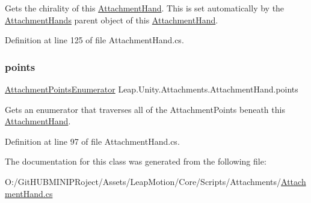 Gets the chirality of this \mbox{\hyperlink{class_leap_1_1_unity_1_1_attachments_1_1_attachment_hand}{Attachment\+Hand}}. This is set automatically by the \mbox{\hyperlink{class_leap_1_1_unity_1_1_attachments_1_1_attachment_hands}{Attachment\+Hands}} parent object of this \mbox{\hyperlink{class_leap_1_1_unity_1_1_attachments_1_1_attachment_hand}{Attachment\+Hand}}. 



Definition at line 125 of file Attachment\+Hand.\+cs.

\mbox{\label{class_leap_1_1_unity_1_1_attachments_1_1_attachment_hand_aeb29b522823d247cf907a2488f1fbebf}} 
\subsubsection{\texorpdfstring{points}{points}}
{\footnotesize\ttfamily \mbox{\hyperlink{struct_leap_1_1_unity_1_1_attachments_1_1_attachment_hand_1_1_attachment_points_enumerator}{Attachment\+Points\+Enumerator}} Leap.\+Unity.\+Attachments.\+Attachment\+Hand.\+points\hspace{0.3cm}{\ttfamily [get]}}



Gets an enumerator that traverses all of the Attachment\+Points beneath this \mbox{\hyperlink{class_leap_1_1_unity_1_1_attachments_1_1_attachment_hand}{Attachment\+Hand}}. 



Definition at line 97 of file Attachment\+Hand.\+cs.



The documentation for this class was generated from the following file\+:\begin{DoxyCompactItemize}
\item 
O\+:/\+Git\+H\+U\+B\+M\+I\+N\+I\+P\+Roject/\+Assets/\+Leap\+Motion/\+Core/\+Scripts/\+Attachments/\mbox{\hyperlink{_attachment_hand_8cs}{Attachment\+Hand.\+cs}}\end{DoxyCompactItemize}
